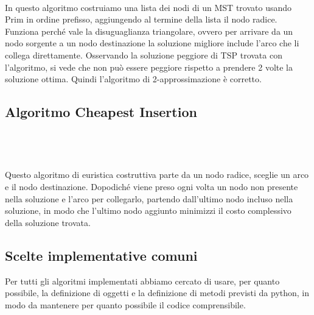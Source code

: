 \begin{verbatim}
    
\end{verbatim}

In questo algoritmo costruiamo una lista dei nodi di un MST trovato usando Prim in ordine prefisso, aggiungendo al termine della lista il nodo radice.
Funziona perché vale la disuguaglianza triangolare, ovvero per arrivare da un nodo sorgente a un nodo destinazione la soluzione migliore include l'arco che li collega direttamente.
Osservando la soluzione peggiore di TSP trovata con l'algoritmo, si vede che non può essere peggiore rispetto a prendere 2 volte la soluzione ottima.
Quindi l'algoritmo di 2-approssimazione è corretto.

\clearpage

\subsection{Algoritmo Cheapest Insertion\label{sec:ci}}
\begin{verbatim}
    
\end{verbatim}

\begin{verbatim}
    
\end{verbatim}

Questo algoritmo di euristica costruttiva parte da un nodo radice, sceglie un arco e il nodo destinazione.
Dopodiché viene preso ogni volta un nodo non presente nella soluzione e l'arco per collegarlo, partendo dall'ultimo nodo incluso nella soluzione, in modo che l'ultimo nodo aggiunto minimizzi il costo complessivo della soluzione trovata.

\subsection{Scelte implementative comuni\label{sec:comuni}}
Per tutti gli algoritmi implementati abbiamo cercato di usare, per quanto possibile, la definizione di oggetti e la definizione di metodi previsti da python, in modo da mantenere per quanto possibile il codice comprensibile.